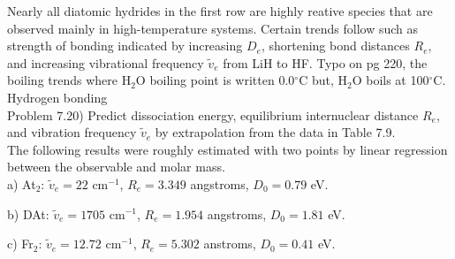 \documentclass{article}
\begin{document}
  {\color{blue}
  Nearly all diatomic hydrides in the first row are highly reative species that are
  observed mainly in high-temperature systems. Certain trends follow such as strength
  of bonding indicated by increasing $D_e$, shortening bond distances $R_e$, and
  increasing vibrational frequency $\tilde{v}_e$ from LiH to HF. Typo on pg 220, the
  boiling trends where H$_2$O boiling point is written 0.0$^{\circ}$C but, H$_2$O boils
  at 100$^{\circ}$C. Hydrogen bonding}
  \\
  
  Problem 7.20) Predict dissociation energy, equilibrium internuclear distance $R_e$,
  and vibration frequency $\tilde{v}_e$ by extrapolation from the data in Table 7.9.
  \\

  \color{blue}
  The following results were roughly estimated with two points by linear regression
  between the observable and molar mass.
  \\
  
  a) At$_2$: $\tilde{v}_e=22$ cm$^{-1}$, $R_e=3.349$ angstroms, $D_0=0.79$ eV.

  b) DAt: $\tilde{v}_e=1705$ cm$^{-1}$, $R_e=1.954$ angstroms, $D_0=1.81$ eV.

  c) Fr$_2$: $\tilde{v}_e=12.72$ cm$^{-1}$, $R_e=5.302$ anstroms, $D_0=0.41$ eV.
\end{document}
